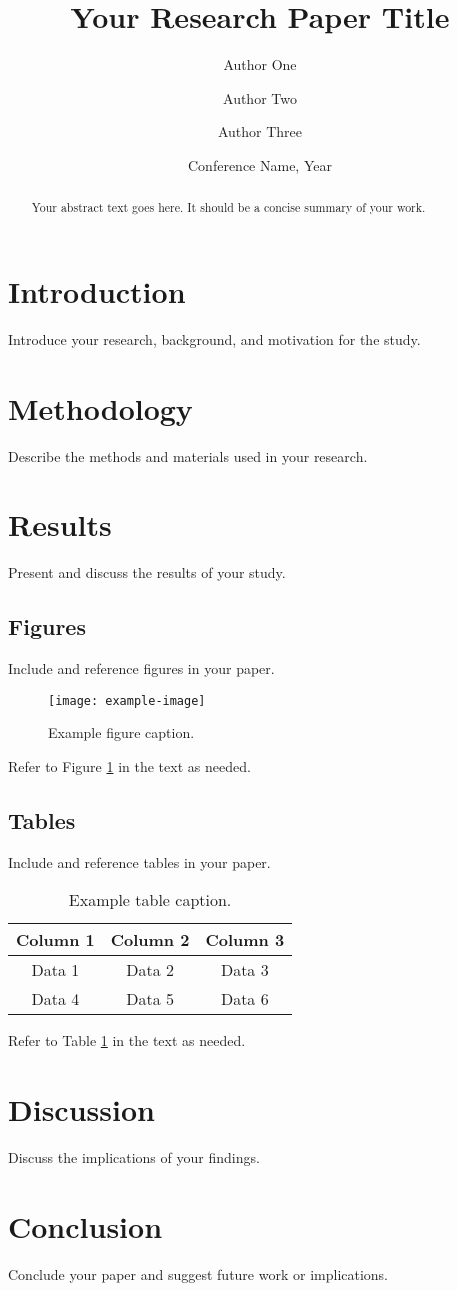 \documentclass[10pt,twocolumn]{article} %
\title{Your Research Paper Title}
\author{Author One \and Author Two \and Author Three}
\date{Conference Name, Year}
\begin{document}
\maketitle

\begin{abstract}
Your abstract text goes here. It should be a concise summary of your work.
\end{abstract}

\section{Introduction}
Introduce your research, background, and motivation for the study.

\section{Methodology}
Describe the methods and materials used in your research.

\section{Results}
Present and discuss the results of your study.

\subsection{Figures}
Include and reference figures in your paper.

\begin{figure}[ht]
\centering
\texttt{[image: example-image]}
\caption{Example figure caption.}
\label{fig:example}
\end{figure}

Refer to Figure \ref{fig:example} in the text as needed.

\subsection{Tables}
Include and reference tables in your paper.

\begin{table}[ht]
\centering
\caption{Example table caption.}
\label{tab:example}
\begin{tabular}{|c|c|c|}
\hline
Column 1 & Column 2 & Column 3 \\
\hline
Data 1 & Data 2 & Data 3 \\
Data 4 & Data 5 & Data 6 \\
\hline
\end{tabular}
\end{table}

Refer to Table \ref{tab:example} in the text as needed.

\section{Discussion}
Discuss the implications of your findings.

\section{Conclusion}
Conclude your paper and suggest future work or implications.

\end{document}
